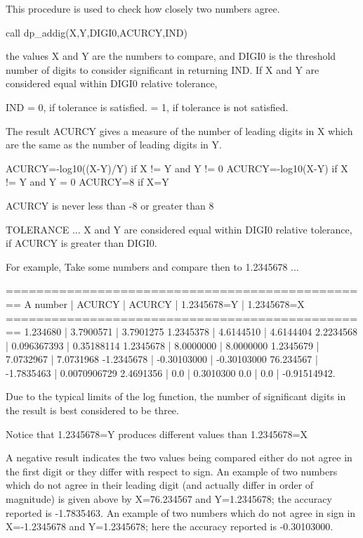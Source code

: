 \begin{DoxyVerb}This procedure is used to check how closely two numbers agree.

   call dp_addig(X,Y,DIGI0,ACURCY,IND)

the values X and Y are the numbers to compare, and DIGI0 is the
threshold number of digits to consider significant in returning IND.
If X and Y are considered equal within DIGI0 relative tolerance,

    IND    = 0, if tolerance is     satisfied.
           = 1, if tolerance is not satisfied.

The result ACURCY gives a measure of the number of leading digits in X
which are the same as the number of leading digits in Y.

        ACURCY=-log10((X-Y)/Y)   if X != Y and Y != 0
        ACURCY=-log10(X-Y)       if X != Y and Y = 0
        ACURCY=8                 if X=Y

        ACURCY is never less than -8 or greater than 8

TOLERANCE ...
     X and Y are considered equal within DIGI0 relative tolerance,
     if ACURCY is greater than DIGI0.

For example, Take some numbers and compare then  to 1.2345678 ...

   ================================================
   A number     |    ACURCY       |   ACURCY
                |    1.2345678=Y  |   1.2345678=X
   ================================================
    1.234680    |    3.7900571    |   3.7901275
    1.2345378   |    4.6144510    |   4.6144404
    2.2234568   |    0.096367393  |   0.35188114
    1.2345678   |    8.0000000    |   8.0000000
    1.2345679   |    7.0732967    |   7.0731968
   -1.2345678   |   -0.30103000   |  -0.30103000
   76.234567    |   -1.7835463    |   0.0070906729
    2.4691356   |    0.0          |   0.3010300
    0.0         |    0.0          |  -0.91514942.

Due to the typical limits of the log function, the number of
significant digits in the result is best considered to be three.

Notice that 1.2345678=Y produces different values than 1.2345678=X

A negative result indicates the two values being compared either do
not agree in the first digit or they differ with respect to sign. An
example of two numbers which do not agree in their leading digit (and
actually differ in order of magnitude) is given above by X=76.234567
and Y=1.2345678; the accuracy reported is -1.7835463. An example of
two numbers which do not agree in sign in X=-1.2345678 and Y=1.2345678;
here the accuracy reported is -0.30103000.
\end{DoxyVerb}


